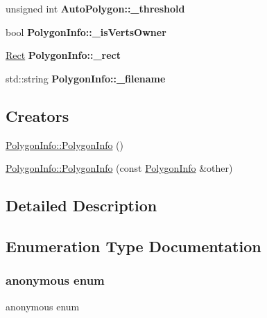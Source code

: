 \begin{DoxyCompactItemize}
\mbox{\label{group____2d_gaac88e340e4b0156d61b6cc9cc22182de}} 
unsigned int {\bfseries Auto\+Polygon\+::\+\_\+threshold}
\item 
\mbox{\label{group____2d_ga664b6425ce8bbef5dca23fb3354b690d}} 
bool {\bfseries Polygon\+Info\+::\+\_\+is\+Verts\+Owner}
\item 
\mbox{\label{group____2d_ga8deed510b8b3d6490c66c7cdc4c4a315}} 
\hyperlink{classRect}{Rect} {\bfseries Polygon\+Info\+::\+\_\+rect}
\item 
\mbox{\label{group____2d_gab8ed08e8bf879fdd1141c028a23fc64f}} 
std\+::string {\bfseries Polygon\+Info\+::\+\_\+filename}
\end{DoxyCompactItemize}
\subsection*{Creators}
\begin{DoxyCompactItemize}
\item 
\hyperlink{group____2d_ga069ceb08829c62f4d834b633b86ae420}{Polygon\+Info\+::\+Polygon\+Info} ()
\item 
\hyperlink{group____2d_gaf6fd909ca1d09d9b4acff7ca0be82683}{Polygon\+Info\+::\+Polygon\+Info} (const \hyperlink{classPolygonInfo}{Polygon\+Info} \&other)
\end{DoxyCompactItemize}


\subsection{Detailed Description}


\subsection{Enumeration Type Documentation}
\mbox{\label{group____2d_gaba01db17f4a2bfbc3db60dc172972a25}} 
\subsubsection{\texorpdfstring{anonymous enum}{anonymous enum}}
{\footnotesize\ttfamily anonymous enum}

